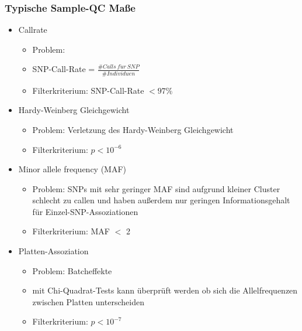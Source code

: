 \subsubsection{Typische Sample-QC Maße}
\begin{itemize}
	\item Callrate
	\begin{itemize}
		\item Problem: 
		\item SNP-Call-Rate = $\frac{\#Calls\ f\ddot{u}r\ SNP}{\#Individuen}$
		\item Filterkriterium: SNP-Call-Rate $<97\%$
	\end{itemize}
	\item Hardy-Weinberg Gleichgewicht
	\begin{itemize}
		\item Problem: Verletzung des Hardy-Weinberg Gleichgewicht
		\item Filterkriterium: $p<10^{-6}$
	\end{itemize}
	\item Minor allele frequency (MAF)
	\begin{itemize}
		\item Problem: SNPs mit sehr geringer MAF sind aufgrund kleiner Cluster schlecht zu callen und haben außerdem nur geringen Informationsgehalt für Einzel-SNP-Assoziationen
		\item Filterkriterium: MAF $<$ 2
	\end{itemize}
	\item Platten-Assoziation
	\begin{itemize}
		\item Problem: Batcheffekte
		\item mit Chi-Quadrat-Tests kann überprüft werden ob sich die Allelfrequenzen zwischen Platten unterscheiden
		\item Filterkriterium: $p<10^{-7}$
	\end{itemize}
\end{itemize}
